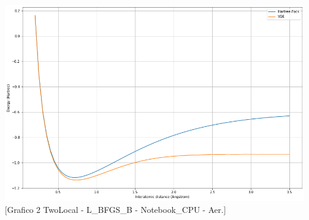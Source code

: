 \hfill
\begin{minipage}[b]{0.57\textwidth}
    \centering
    \includegraphics[width=1.0\textwidth]{Images/Capitolo3/Plots/H2_twolocal_ry_rz_cz_aer_cpu_plot.png}
    [Grafico 2 \newline TwoLocal - L\_BFGS\_B - Notebook\_CPU - Aer.]{}
    \label{fig:notebookcpu_twolocal_aer}
\end{minipage}
